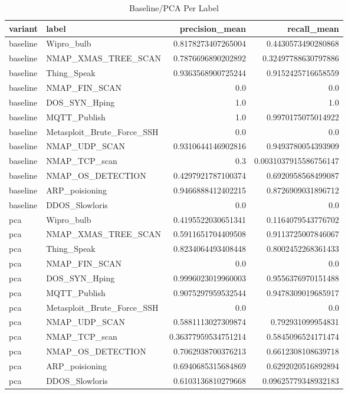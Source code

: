 \documentclass[11pt]{article}
\begin{document}
\begin{table}[H]
	\centering
	\begin{tabular}{ | l | l | r | r | }
		\hline
		\textbf{variant} & \textbf{label} & \textbf{precision\_mean} & \textbf{recall\_mean} \\
		\hline		
		baseline & Wipro\_bulb & 0.8178273407265004 & 0.4430573490280868 \\
		\hline
		baseline & NMAP\_XMAS\_TREE\_SCAN & 0.7876696890202892 & 0.32497788630797886 \\
		\hline
		baseline & Thing\_Speak & 0.9363568900725244 & 0.9152425716658559 \\
		\hline
		baseline & NMAP\_FIN\_SCAN & 0.0 & 0.0 \\
		\hline
		baseline & DOS\_SYN\_Hping & 1.0 & 1.0 \\
		\hline
		baseline & MQTT\_Publish & 1.0 & 0.9970175075014922 \\
		\hline
		baseline & Metasploit\_Brute\_Force\_SSH & 0.0 & 0.0 \\
		\hline
		baseline & NMAP\_UDP\_SCAN & 0.9310644146902816 & 0.9493780054393909 \\
		\hline
		baseline & NMAP\_TCP\_scan & 0.3 & 0.0031037915586756147 \\
		\hline
		baseline & NMAP\_OS\_DETECTION & 0.4297921787100374 & 0.6920958568499087 \\
		\hline
		baseline & ARP\_poisioning & 0.9466888412402215 & 0.8726909031896712 \\
		\hline
		baseline & DDOS\_Slowloris & 0.0 & 0.0 \\
		\hline
		pca & Wipro\_bulb & 0.4195522030651341 & 0.1164079543776702 \\
		\hline
		pca & NMAP\_XMAS\_TREE\_SCAN & 0.5911651704409508 & 0.9113725007846067 \\
		\hline
		pca & Thing\_Speak & 0.8234064493408448 & 0.8002452268361433 \\
		\hline
		pca & NMAP\_FIN\_SCAN & 0.0 & 0.0 \\
		\hline
		pca & DOS\_SYN\_Hping & 0.9996023019960003 & 0.9556376970151488 \\
		\hline
		pca & MQTT\_Publish & 0.9075297959532544 & 0.9478309019685917 \\
		\hline
		pca & Metasploit\_Brute\_Force\_SSH & 0.0 & 0.0 \\
		\hline
		pca & NMAP\_UDP\_SCAN & 0.5881113027309874 & 0.792931099954831 \\
		\hline
		pca & NMAP\_TCP\_scan & 0.36377959534751214 & 0.5845096524171474 \\
		\hline
		pca & NMAP\_OS\_DETECTION & 0.7062938700376213 & 0.6612308108639718 \\
		\hline
		pca & ARP\_poisioning & 0.6940685315684869 & 0.6292020516892894 \\
		\hline
		pca & DDOS\_Slowloris & 0.6103136810279668 & 0.09625779348932183 \\
		\hline
	\end{tabular}
\caption{Baseline/PCA Per Label}
\end{table}	
\end{document}
